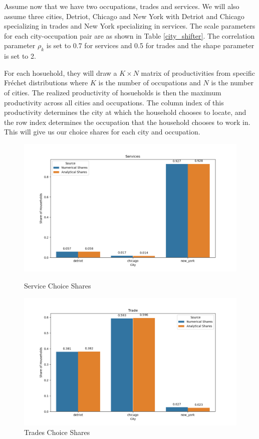 \documentclass[10pt]{article}
\begin{document}
Assume now that we have two occupations, trades and services. We will also assume three cities, Detriot, Chicago and New York with Detriot and Chicago specializing in trades and New York specializing in services. The scale parameters for each city-occupation pair are as shown in Table \ref{city_shifter}. The correlation parameter $\rho_k$ is set to 0.7 for services and 0.5 for trades and the shape parameter is set to 2.

For each hosuehold, they will draw a $K \times N$ matrix of productivities from specific Fr\'{e}chet distributions where $K$ is the number of occupations and $N$ is the number of cities. The realized productivity of hosueholds is then the maximum productivity across all cities and occupations. The column index of this productivity determines the city at which the household chooses to locate, and the row index determines the occupation that the household chooses to work in. This will give us our choice shares for each city and occupation.

\begin{figure}[!htb]
    \begin{minipage}{0.5\textwidth}
        \centering
        \includegraphics[width=\textwidth]{../../simulations/graphs/sim_services.png}
        \caption{Service Choice Shares}
        \label{sim_services}
    \end{minipage}
    \begin{minipage}{0.5\textwidth}
        \centering
        \includegraphics[width=\textwidth]{../../simulations/graphs/sim_trade.png}
        \caption{Trades Choice Shares}
        \label{sim_trades}
    \end{minipage}
\end{figure}
\end{document}
